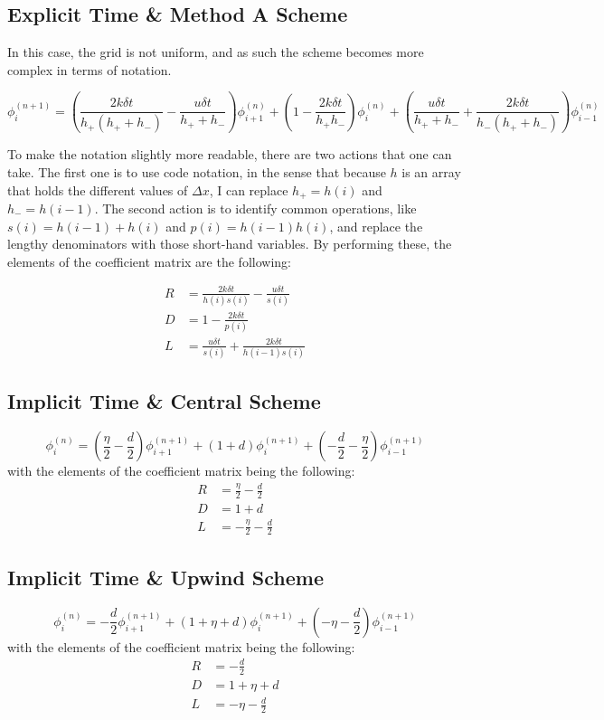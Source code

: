 \subsection{Explicit Time \& Method A Scheme}
\label{subsec: explicit_method_a}
In this case, the grid is not uniform, and as such the scheme becomes more complex in terms of notation.

\[
\phi_{i}^{(n+1)} = \left( \frac{2k \delta t}{h_{+} (h_{+} + h_{-})} - \frac{u \delta t}{h_{+} + h_{-}} \right) \phi_{i+1}^{(n)} + \left( 1 - \frac{2k \delta t}{h_{+}h_{-}} \right) \phi_{i}^{(n)} + \left( \frac{u \delta t}{h_{+} + h_{-}} + \frac{2k \delta t}{h_{-}(h_{+} + h_{-})} \right) \phi_{i-1}^{(n)}
\]

To make the notation slightly more readable, there are two actions that one can take. The first one is to use code notation, in the sense that because \( h \) is an array that holds the different values of \(\Delta x\), I can replace \( h_{+} = h(i) \) and \( h_{-} = h(i-1) \). The second action is to identify common operations, like \( s(i) = h(i-1) + h(i) \) and \( p(i) = h(i-1) h(i) \), and replace the lengthy denominators with those short-hand variables. By performing these, the elements of the coefficient matrix are the following:

\begin{align*}
	R &= \frac{2k \delta t}{h(i) s(i)} - \frac{u \delta t}{s(i)} \\
	D &= 1 - \frac{2k \delta t}{p(i)} \\
	L &= \frac{u \delta t}{s(i)} + \frac{2k \delta t}{h(i-1) s(i)}
\end{align*}

\subsection{Implicit Time \& Central Scheme}
\[
	\phi_{i}^{(n)} = \left( \frac{\eta}{2} - \frac{d}{2} \right) \phi_{i+1}^{(n+1)} + \left( 1 + d \right) \phi_{i}^{(n+1)} + \left( - \frac{d}{2} - \frac{\eta}{2} \right) \phi_{i-1}^{(n+1)}
\]
with the elements of the coefficient matrix being the following:
\begin{align*}
	R &= \frac{\eta}{2} - \frac{d}{2} \\
	D &= 1+d \\
	L &= - \frac{\eta}{2} - \frac{d}{2}
\end{align*}

\subsection{Implicit Time \& Upwind Scheme}
\[
	\phi_{i}^{(n)} = -\frac{d}{2} \phi_{i+1}^{(n+1)} + \left( 1 + \eta + d \right) \phi_{i}^{(n+1)} + \left( - \eta - \frac{d}{2} \right) \phi_{i-1}^{(n+1)}
\]
with the elements of the coefficient matrix being the following:
\begin{align*}
	R &= -\frac{d}{2} \\
	D &= 1 + \eta + d \\
	L &= -\eta - \frac{d}{2}
\end{align*}

